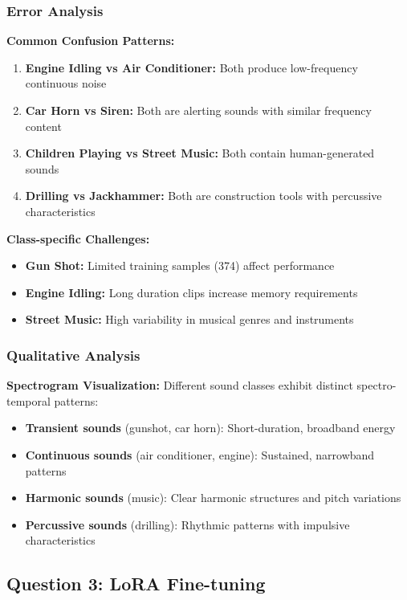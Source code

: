 \documentclass[conference]{IEEEtran}
\begin{document}
\subsubsection{Error Analysis}
\label{sec:q2_error_analysis}

\textbf{Common Confusion Patterns:}
\begin{enumerate}[label=\arabic*.]
  \item \textbf{Engine Idling vs Air Conditioner:} Both produce low-frequency continuous noise
  \item \textbf{Car Horn vs Siren:} Both are alerting sounds with similar frequency content
  \item \textbf{Children Playing vs Street Music:} Both contain human-generated sounds
  \item \textbf{Drilling vs Jackhammer:} Both are construction tools with percussive characteristics
\end{enumerate}

\textbf{Class-specific Challenges:}
\begin{itemize}
  \item \textbf{Gun Shot:} Limited training samples (374) affect performance
  \item \textbf{Engine Idling:} Long duration clips increase memory requirements
  \item \textbf{Street Music:} High variability in musical genres and instruments
\end{itemize}

\subsubsection{Qualitative Analysis}
\label{sec:q2_qualitative}

\textbf{Spectrogram Visualization:} Different sound classes exhibit distinct spectro-temporal patterns:
\begin{itemize}
  \item \textbf{Transient sounds} (gunshot, car horn): Short-duration, broadband energy
  \item \textbf{Continuous sounds} (air conditioner, engine): Sustained, narrowband patterns
  \item \textbf{Harmonic sounds} (music): Clear harmonic structures and pitch variations
  \item \textbf{Percussive sounds} (drilling): Rhythmic patterns with impulsive characteristics
\end{itemize}

\subsection{Question 3: LoRA Fine-tuning}
\label{sec:q3}
\end{document}

